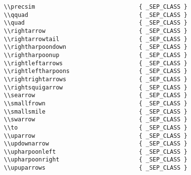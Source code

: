 \begin{verbatim}
\\precsim                              { _SEP_CLASS }
\\qquad                                { _SEP_CLASS }
\\quad                                 { _SEP_CLASS }
\\rightarrow                           { _SEP_CLASS }
\\rightarrowtail                       { _SEP_CLASS }
\\rightharpoondown                     { _SEP_CLASS }
\\rightharpoonup                       { _SEP_CLASS }
\\rightleftarrows                      { _SEP_CLASS }
\\rightleftharpoons                    { _SEP_CLASS }
\\rightrightarrows                     { _SEP_CLASS }
\\rightsquigarrow                      { _SEP_CLASS }
\\searrow                              { _SEP_CLASS }
\\smallfrown                           { _SEP_CLASS }
\\smallsmile                           { _SEP_CLASS }
\\swarrow                              { _SEP_CLASS }
\\to                                   { _SEP_CLASS }
\\uparrow                              { _SEP_CLASS }
\\updownarrow                          { _SEP_CLASS }
\\upharpoonleft                        { _SEP_CLASS }
\\upharpoonright                       { _SEP_CLASS }
\\upuparrows                           { _SEP_CLASS }


\end{verbatim}
